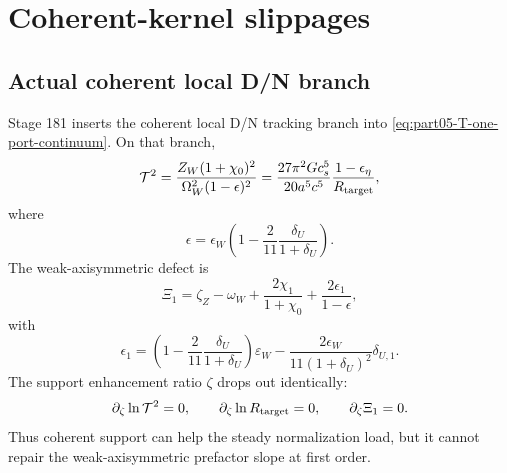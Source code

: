 
\section{Coherent-kernel slippages}
\label{sec:part05_weak_axisymmetric_orbit:coherent-kernel-slippages}

\subsection{Actual coherent local D/N branch}
Stage 181 inserts the coherent local D/N tracking branch into \eqref{eq:part05-T-one-port-continuum}.  On that branch,
\begin{equation}
\label{eq:part05-coherent-T}
\mathcal T^2
=
\frac{Z_W(1+\chi_0)^2}{\Omega_W^2(1-\epsilon)^2}
=
\frac{27\pi^2Gc_s^5}{20a^5c^5}\frac{1-\epsilon_\eta}{R_{\rm target}},
\end{equation}
where
\begin{equation}
\label{eq:part05-epsilon-split}
\epsilon
=
\epsilon_W\left(1-\frac{2}{11}\frac{\delta_U}{1+\delta_U}\right).
\end{equation}
The weak-axisymmetric defect is
\begin{equation}
\label{eq:part05-Xi1-coherent-physical}
\Xi_1
=
\zeta_Z-\omega_W
+
\frac{2\chi_1}{1+\chi_0}
+
\frac{2\epsilon_1}{1-\epsilon},
\end{equation}
with
\begin{equation}
\label{eq:part05-epsilon1-coherent}
\epsilon_1
=
\left(1-\frac{2}{11}\frac{\delta_U}{1+\delta_U}\right)\varepsilon_W
-
\frac{2\epsilon_W}{11(1+\delta_U)^2}\delta_{U,1}.
\end{equation}
The support enhancement ratio \(\zeta\) drops out identically:
\begin{equation}
\label{eq:part05-support-blindness}
\partial_\zeta\ln\mathcal T^2=0,
\qquad
\partial_\zeta\ln R_{\rm target}=0,
\qquad
\partial_\zeta\Xi_1=0.
\end{equation}
Thus coherent support can help the steady normalization load, but it cannot repair the weak-axisymmetric prefactor slope at first order.

